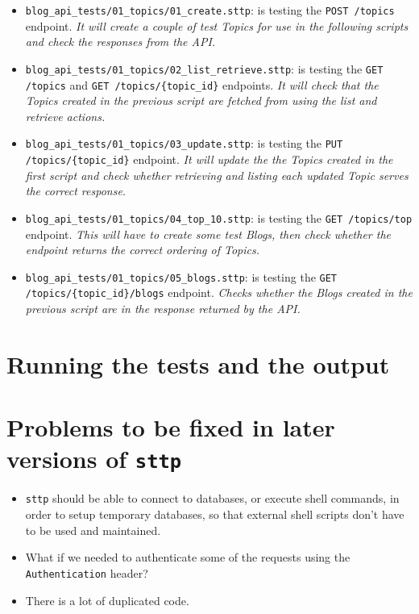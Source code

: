 \begin{itemize}
    \item \verb|blog_api_tests/01_topics/01_create.sttp|: is testing the \verb|POST /topics| endpoint. \textit{It will create a couple of test Topics for use in the following scripts and check the responses from the API.}
    \item \verb|blog_api_tests/01_topics/02_list_retrieve.sttp|: is testing the \verb|GET /topics| and \verb|GET /topics/{topic_id}| endpoints. \textit{It will check that the Topics created in the previous script are fetched from using the list and retrieve actions.}
    \item \verb|blog_api_tests/01_topics/03_update.sttp|: is testing the \verb|PUT /topics/{topic_id}| endpoint. \textit{It will update the the Topics created in the first script and check whether retrieving and listing each updated Topic serves the correct response.}
    \item \verb|blog_api_tests/01_topics/04_top_10.sttp|: is testing the \verb|GET /topics/top| endpoint. \textit{This will have to create some test Blogs, then check whether the endpoint returns the correct ordering of Topics.}
    \item \verb|blog_api_tests/01_topics/05_blogs.sttp|: is testing the \verb|GET /topics/{topic_id}/blogs| endpoint. \textit{Checks whether the Blogs created in the previous script are in the response returned by the API.}
\end{itemize}

\section{Running the tests and the output}

\cprotect\section{Problems to be fixed in later versions of \verb|sttp|}
\label{sec:hello-sttp-problems-to-be-fixed}

\begin{itemize}
    \item \verb|sttp| should be able to connect to databases, or execute shell commands, in order to setup temporary databases, so that external shell scripts don't have to be used and maintained.
    \item What if we needed to authenticate some of the requests using the \verb|Authentication| header?
    \item There is a lot of duplicated code.
\end{itemize}
